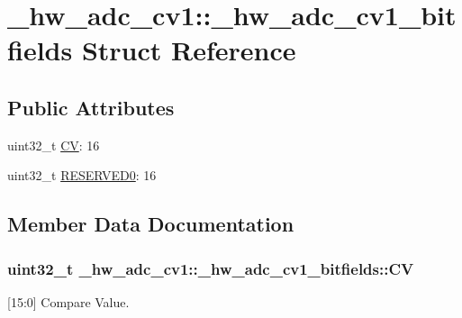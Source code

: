 \hypertarget{struct__hw__adc__cv1_1_1__hw__adc__cv1__bitfields}{}\section{\+\_\+hw\+\_\+adc\+\_\+cv1\+:\+:\+\_\+hw\+\_\+adc\+\_\+cv1\+\_\+bitfields Struct Reference}
\label{struct__hw__adc__cv1_1_1__hw__adc__cv1__bitfields}
\subsection*{Public Attributes}
\begin{DoxyCompactItemize}
\item 
uint32\+\_\+t \hyperlink{struct__hw__adc__cv1_1_1__hw__adc__cv1__bitfields_ace126b24fbcbfe6d18d4e1a179a4e901}{CV}\+: 16
\item 
uint32\+\_\+t \hyperlink{struct__hw__adc__cv1_1_1__hw__adc__cv1__bitfields_a26238fc7824125d0d1201b088e9f14e2}{R\+E\+S\+E\+R\+V\+E\+D0}\+: 16
\end{DoxyCompactItemize}


\subsection{Member Data Documentation}
\subsubsection[{\texorpdfstring{CV}{CV}}]{\setlength{\rightskip}{0pt plus 5cm}uint32\+\_\+t \+\_\+hw\+\_\+adc\+\_\+cv1\+::\+\_\+hw\+\_\+adc\+\_\+cv1\+\_\+bitfields\+::\+CV}\hypertarget{struct__hw__adc__cv1_1_1__hw__adc__cv1__bitfields_ace126b24fbcbfe6d18d4e1a179a4e901}{}\label{struct__hw__adc__cv1_1_1__hw__adc__cv1__bitfields_ace126b24fbcbfe6d18d4e1a179a4e901}
\mbox{[}15\+:0\mbox{]} Compare Value. 
